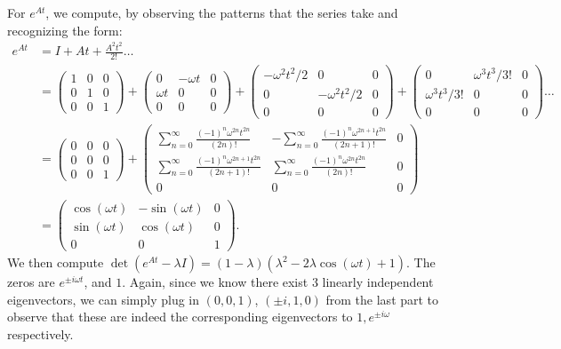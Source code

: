 \documentclass[11pt]{article}
\begin{document}
For $e^{At}$, we compute, by observing the patterns that the series take and recognizing the form:
\begin{align*}
    e^{At} &=  I + At + \frac{A^2 t^2}{2!} \ldots \\
           &= \begin{pmatrix} 1 & 0 & 0 \\ 0 & 1 & 0 \\ 0 & 0 & 1 \end{pmatrix}  + \begin{pmatrix} 0 & - \omega t & 0 \\ \omega  t & 0 & 0 \\ 0 & 0 & 0 \end{pmatrix} + \begin{pmatrix} - \omega^2 t^2 /2 & 0 & 0 \\ 0 &  - \omega^2 t^2 /2 & 0 \\ 0 & 0 & 0 \end{pmatrix} + \begin{pmatrix} 0 & \omega^{3} t^3 / 3! & 0 \\ \omega^{3}  t^3 / 3! & 0 & 0 \\ 0 & 0 & 0 \end{pmatrix} \ldots \\
           &= \begin{pmatrix} 0&0&0 \\ 0 & 0 & 0 \\ 0 & 0 & 1 \end{pmatrix}  +  \begin{pmatrix} \sum_{n=0}^{\infty} \frac{(-1)^{n}\omega^{2n} t^{2n}}{(2n)!} & - \sum_{n = 0}^{\infty} \frac{(-1)^{n}\omega^{2n+1} t^{2n}}{(2n+1)!} & 0 \\ \sum_{n = 0}^{\infty} \frac{(-1)^{n}\omega^{2n+1} t^{2n}}{(2n+1)!} &\sum_{n=0}^{\infty} \frac{(-1)^{n}\omega^{2n} t^{2n}}{(2n)!} & 0 \\ 0 & 0 & 0 \end{pmatrix}\\
           &= \begin{pmatrix} \cos(\omega t) & -\sin(\omega t) & 0 \\ \sin(\omega t) & \cos(\omega t) & 0 \\ 0 & 0 & 1 \end{pmatrix} 
.\end{align*}
We then compute $\det (e^{At} - \lambda I) = (1 - \lambda) (\lambda^2 - 2\lambda \cos(\omega t) + 1)$.
The zeros are $e^{\pm i \omega t}$, and $1$.
Again, since we know there exist 3 linearly independent eigenvectors, we can simply plug in $(0, 0, 1)$, $(\pm i, 1, 0)$ from the last part to observe that these are indeed the corresponding eigenvectors to $1, e^{\pm i\omega}$ respectively.
\end{document}
